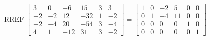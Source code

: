 \begin{exerciseAnswer} 


\[\operatorname{RREF} \left[\begin{array}{cccccc}
3 & 0 & -6 & 15 & 3 & 3 \\
-2 & -2 & 12 & -32 & 1 & -2 \\
-2 & -4 & 20 & -54 & 3 & -4 \\
4 & 1 & -12 & 31 & 3 & -2
\end{array}\right] = \left[\begin{array}{cccccc}
1 & 0 & -2 & 5 & 0 & 0 \\
0 & 1 & -4 & 11 & 0 & 0 \\
0 & 0 & 0 & 0 & 1 & 0 \\
0 & 0 & 0 & 0 & 0 & 1
\end{array}\right] \]



\end{exerciseAnswer}

